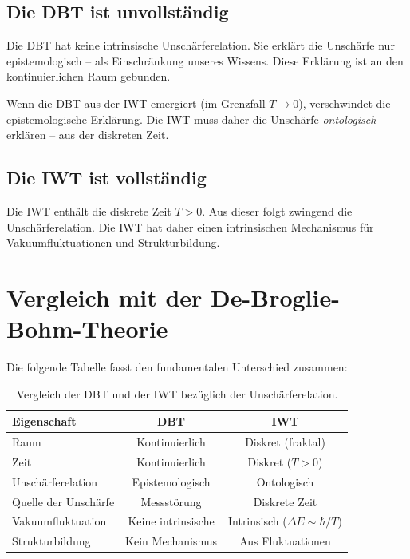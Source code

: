 \subsection{Die DBT ist unvollständig}

Die DBT hat keine intrinsische Unschärferelation. Sie erklärt die Unschärfe nur epistemologisch – als Einschränkung unseres Wissens. Diese Erklärung ist an den kontinuierlichen Raum gebunden.

Wenn die DBT aus der IWT emergiert (im Grenzfall $T \to 0$), verschwindet die epistemologische Erklärung. Die IWT muss daher die Unschärfe \emph{ontologisch} erklären – aus der diskreten Zeit.

\subsection{Die IWT ist vollständig}

Die IWT enthält die diskrete Zeit $T > 0$. Aus dieser folgt zwingend die Unschärferelation. Die IWT hat daher einen intrinsischen Mechanismus für Vakuumfluktuationen und Strukturbildung.

\section{Vergleich mit der De-Broglie-Bohm-Theorie}
\label{app:unschaerfe_vergleich_dbt}

Die folgende Tabelle fasst den fundamentalen Unterschied zusammen:

\begin{table}[htbp]
\centering
\begin{tabular}{|l|c|c|}
\hline
\textbf{Eigenschaft} & \textbf{DBT} & \textbf{IWT} \\
\hline
Raum & Kontinuierlich & Diskret (fraktal) \\
Zeit & Kontinuierlich & Diskret ($T > 0$) \\
Unschärferelation & Epistemologisch & Ontologisch \\
Quelle der Unschärfe & Messstörung & Diskrete Zeit \\
Vakuumfluktuation & Keine intrinsische & Intrinsisch ($\Delta E \sim \hbar/T$) \\
Strukturbildung & Kein Mechanismus & Aus Fluktuationen \\
\hline
\end{tabular}
\caption{Vergleich der DBT und der IWT bezüglich der Unschärferelation.}
\label{tab:unschaerfe_vergleich}
\end{table}

